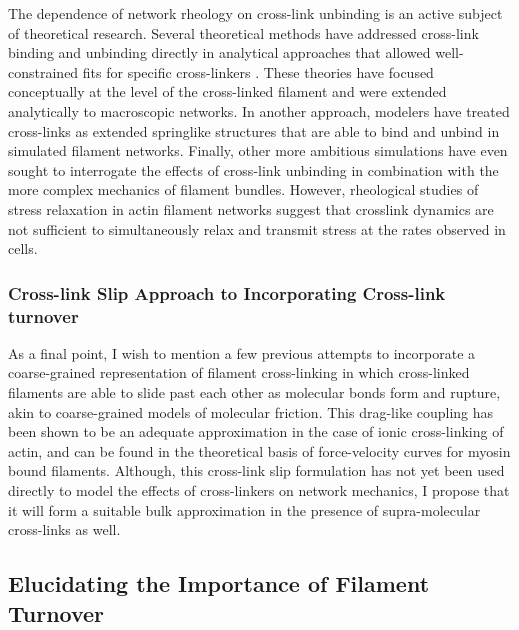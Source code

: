 The dependence of network rheology on cross-link unbinding is an active subject of theoretical research\cite{theo_crosslinkslip2}.  Several theoretical methods have addressed cross-link binding and unbinding directly in analytical approaches that allowed well-constrained fits for specific cross-linkers \cite{theo_crosslinkslip1, theo_crosslinkslip2}.  These theories have focused conceptually at the level of the cross-linked filament and were extended analytically to macroscopic networks.  In another approach, modelers have treated cross-links as extended springlike structures \cite{model_taeyoon} that are able to bind and unbind in simulated filament networks. Finally, other more ambitious simulations have even sought to interrogate the effects of cross-link unbinding in combination with the more complex mechanics of filament bundles\cite{rheo_crosslinkslip2,theo_crosslinkslip3}. However, rheological studies of stress relaxation in actin filament networks suggest that crosslink dynamics are not sufficient to simultaneously relax and transmit stress at the rates observed in cells\cite{De-La-Cruz:2015aa}.

\subsubsection{Cross-link Slip Approach to Incorporating Cross-link turnover}

As a final point, I wish to mention a few previous attempts to incorporate a coarse-grained representation of filament cross-linking in which cross-linked filaments are able to slide past each other as molecular bonds form and rupture, akin to coarse-grained models of molecular friction\cite{theo_friction,theo_frictionSam,theo_molefric}.  This drag-like coupling has been shown to be an adequate approximation in the case of ionic cross-linking of actin\cite{mol_fric,theo_hydroish2}, and can be found in the theoretical basis of force-velocity curves for myosin bound filaments\cite{theo_frictionShila}. Although, this cross-link slip formulation has not yet been used directly to model the effects of cross-linkers on network mechanics, I propose that it will form a suitable bulk approximation in the presence of supra-molecular cross-links as well.

\subsection{Elucidating the Importance of Filament Turnover}

